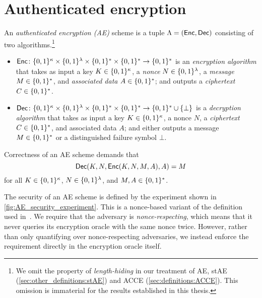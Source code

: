 \section{Authenticated encryption}\label{sec:other_definitions:AE}



An \emph{authenticated encryption (AE)} scheme is a tuple $\Lambda = (\mathsf{Enc},\mathsf{Dec})$ consisting of two algorithms.\footnote{We 
omit the property of \emph{length-hiding} in our treatment of AE, stAE (\cref{sec:other_definitions:stAE}) and ACCE (\cref{sec:definitions:ACCE}).
This omission is immaterial for the results established in this thesis.
}

\begin{itemize}
	
	\item  $\mathsf{Enc} \colon \lbrace 0, 1 \rbrace^{\kappa} \times \lbrace 0, 1 \rbrace^\lambda \times \lbrace 0, 1 \rbrace^* \times \lbrace 0, 1 \rbrace^*  \to \lbrace 0, 1 \rbrace^*$ is an \emph{encryption algorithm} that takes as input a key $K \in \lbrace 0, 1 \rbrace^\kappa$, a \emph{nonce} $N \in \lbrace 0, 1 \rbrace^\lambda$,
	a \emph{message} $M \in \lbrace 0, 1 \rbrace^*$,
	and \emph{associated data} $A \in \lbrace 0, 1 \rbrace^*$; and outputs a \emph{ciphertext} $C \in \lbrace 0, 1 \rbrace^*$.
	
	\item $\mathsf{Dec} \colon \lbrace 0, 1 \rbrace^{\kappa} \times \lbrace 0, 1 \rbrace^\lambda \times \lbrace 0, 1 \rbrace^* \times \lbrace 0, 1 \rbrace^*  \to \lbrace 0, 1 \rbrace^* \cup \lbrace \bot \rbrace$ is a 
	\emph{decryption algorithm} that takes as input a key $K \in \lbrace 0, 1 \rbrace^\kappa$,
	a nonce $N$,
	a \emph{ciphertext} $C \in \lbrace 0, 1 \rbrace^*$,
	and associated data $A$;
	and either outputs a message $M \in \lbrace 0, 1 \rbrace^*$ or a distinguished failure symbol $\bot$.

\end{itemize}





Correctness of an AE scheme demands that 
\begin{equation}
	\mathsf{Dec}(K, N, \mathsf{Enc}(K, N, M, A), A) = M
\end{equation}
for all $K \in \lbrace 0, 1 \rbrace^\kappa$,
$N \in \lbrace 0, 1 \rbrace^\lambda$,
and $M, A \in \lbrace 0, 1 \rbrace^*$.

The security of an AE scheme is defined by the experiment shown in \cref{fig:AE_security_experiment}.
This is a nonce-based variant of the definition used in~\cite{AC:PatRisShr11}.
We require that the adversary is \emph{nonce-respecting},
which means that it never queries its encryption oracle with the same nonce twice.
However,
rather than only quantifying over nonce-respecting adversaries,
we instead enforce the requirement directly in the encryption oracle itself.


